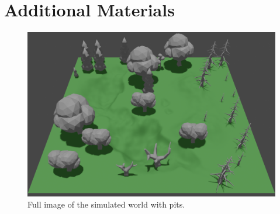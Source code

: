\documentclass[twocolumn, a4paper]{article}
\begin{document}
\section{Additional Materials}
\begin{figure}[!h]
    \centering
    \includegraphics[width=18cm]{"../Report_images/World.png"}
    \caption{Full image of the simulated world with pits.}
\end{figure}
\end{document}
